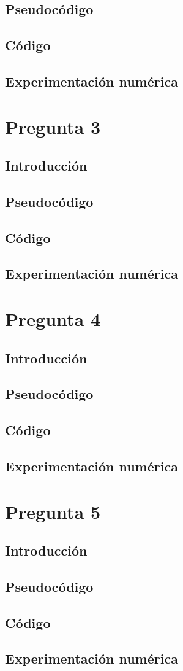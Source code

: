 \documentclass[12pt]{article}
\begin{document}
\subsection{Pseudocódigo}
\subsection{Código}
\subsection{Experimentación numérica}


\section{Pregunta 3}
\subsection{Introducción}
\subsection{Pseudocódigo}
\subsection{Código}
\subsection{Experimentación numérica}

\section{Pregunta 4}
\subsection{Introducción}
\subsection{Pseudocódigo}
\subsection{Código}
\subsection{Experimentación numérica}

\section{Pregunta 5}
\subsection{Introducción}
\subsection{Pseudocódigo}
\subsection{Código}
\subsection{Experimentación numérica}
\end{document}
